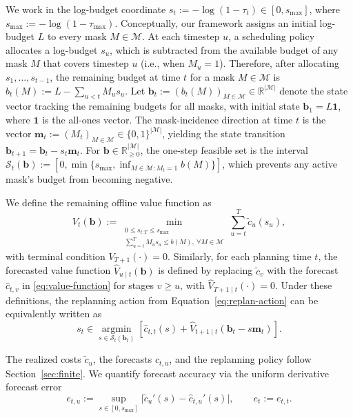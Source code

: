 \documentclass{uai2026} %
\newcommand{\R}{\mathbb{R}}
\newcommand{\1}{\mathbf{1}}
\newcommand{\scalt}{\mathcal{S}_{t}}
\newcommand{\mcal}{\mathcal{M}}
\newcommand{\argmin}{\operatorname*{argmin}}
\begin{document}
We work in the log-budget coordinate $s_t := -\log(1-\tau_t) \in [0, s_{\max}]$, where $s_{\max} := -\log(1-\tau_{\max})$.
Conceptually, our framework assigns an initial log-budget $L$ to every mask $M \in \mcal$. At each timestep $u$, a scheduling policy allocates a log-budget $s_u$, which is subtracted from the available budget of any mask $M$ that covers timestep $u$ (i.e., when $M_u = 1$).
Therefore, after allocating $s_1, \dots, s_{t-1}$, the remaining budget at time $t$ for a mask $M \in \mcal$ is $b_t(M) := L - \sum_{u < t} M_u s_u$.
Let $\mathbf{b}_t := (b_t(M))_{M \in \mcal} \in \R^{|\mcal|}$ denote the state vector tracking the remaining budgets for all masks, with initial state $\mathbf{b}_1 = L\1$, where $\1$ is the all-ones vector.
The mask-incidence direction at time $t$ is the vector $\mathbf{m}_t := (M_t)_{M \in \mcal} \in \{0,1\}^{|\mcal|}$, yielding the state transition $\mathbf{b}_{t+1} = \mathbf{b}_t - s_t \mathbf{m}_t$.
For $\mathbf{b} \in \R_{\ge 0}^{|\mcal|}$, the one-step feasible set is the interval $\scalt(\mathbf{b}) := [0, \min\{s_{\max}, \inf_{M\in\mcal: M_t = 1} b(M)\}]$, which prevents any active mask's budget from becoming negative.

We define the remaining offline value function as
\begin{equation}
  \label{eq:value-function}
  V_t(\mathbf{b})
  := \min_{\substack{0 \le s_{t:T} \le s_{\max} \\
  \sum_{u=t}^{T} M_u s_u \le b(M),\ \forall M \in \mcal}}
  \sum_{u=t}^{T} \tilde{c}_u(s_u),
\end{equation}
with terminal condition $V_{T+1}(\cdot) = 0$.
Similarly, for each planning time $t$, the forecasted value function $\hat{V}_{u \mid t}(\mathbf{b})$ is defined by replacing $\tilde{c}_v$ with the forecast $\hat{c}_{t,v}$ in \eqref{eq:value-function} for stages $v \ge u$, with $\hat{V}_{T+1 \mid t}(\cdot)=0$.
Under these definitions, the replanning action from Equation~\eqref{eq:replan-action} can be equivalently written as
\begin{equation}
  \label{eq:replan-action-value}
  s_t \in \argmin_{s \in \scalt(\mathbf{b}_t)} \left[ \hat{c}_{t,t}(s) + \hat{V}_{t+1 \mid t}(\mathbf{b}_t - s\mathbf{m}_t) \right].
\end{equation}

The realized costs $\tilde{c}_u$, the forecasts $\hat{c}_{t,u}$, and the replanning policy follow Section~\ref{sec:finite}.
We quantify forecast accuracy via the uniform derivative forecast error
\begin{equation*}
  e_{t,u} := \sup_{s\in[0,s_{\max}]} \bigl|\tilde{c}_u'(s) - \hat{c}_{t,u}'(s)\bigr|,
  \qquad
  e_t := e_{t,t}.
\end{equation*}
\end{document}
